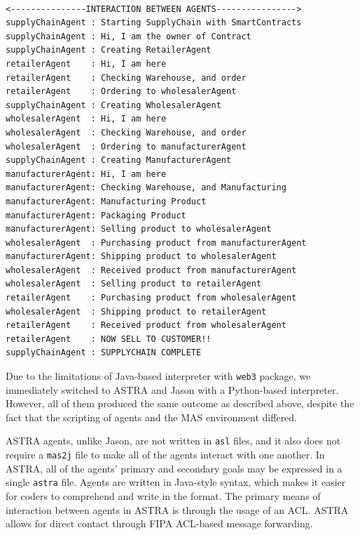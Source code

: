 \begin{lstlisting}[numbers=none, basicstyle=\ttfamily\tiny]

<---------------INTERACTION BETWEEN AGENTS---------------->
supplyChainAgent : Starting SupplyChain with SmartContracts
supplyChainAgent : Hi, I am the owner of Contract
supplyChainAgent : Creating RetailerAgent
retailerAgent    : Hi, I am here
retailerAgent    : Checking Warehouse, and order
retailerAgent    : Ordering to wholesalerAgent
supplyChainAgent : Creating WholesalerAgent
wholesalerAgent  : Hi, I am here
wholesalerAgent  : Checking Warehouse, and order
wholesalerAgent  : Ordering to manufacturerAgent
supplyChainAgent : Creating ManufacturerAgent
manufacturerAgent: Hi, I am here
manufacturerAgent: Checking Warehouse, and Manufacturing
manufacturerAgent: Manufacturing Product
manufacturerAgent: Packaging Product
manufacturerAgent: Selling product to wholesalerAgent
wholesalerAgent  : Purchasing product from manufacturerAgent
manufacturerAgent: Shipping product to wholesalerAgent
wholesalerAgent  : Received product from manufacturerAgent
wholesalerAgent  : Selling product to retailerAgent
retailerAgent    : Purchasing product from wholesalerAgent
wholesalerAgent  : Shipping product to retailerAgent
retailerAgent    : Received product from wholesalerAgent
retailerAgent    : NOW SELL TO CUSTOMER!!
supplyChainAgent : SUPPLYCHAIN COMPLETE
\end{lstlisting}

\vspace{.5cm}

Due to the limitations of Java-based interpreter with \texttt{web3} package, we immediately switched to ASTRA and Jason with a Python-based interpreter. However, all of them produced the same outcome as described above, despite the fact that the scripting of agents and the \ac{MAS} environment differed.

\vspace{.5cm}

ASTRA agents, unlike Jason, are not written in \texttt{asl} files, and it also does not require a \texttt{mas2j} file to make all of the agents interact with one another. In ASTRA, all of the agents' primary and secondary goals may be expressed in a single \texttt{astra} file. Agents are written in Java-style syntax, which makes it easier for coders to comprehend and write in the format. The primary means of interaction between agents in ASTRA is through the usage of an \ac{ACL}. ASTRA allows for direct contact through \ac{FIPA} \ac{ACL}-based message forwarding.


